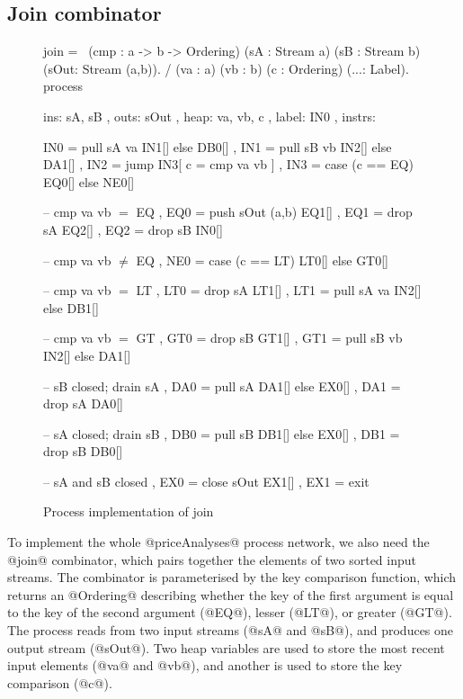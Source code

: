 \subsection{Join combinator}

\begin{figure}
\begin{process}
join 
  = \ (cmp : a -> b -> Ordering)
      (sA  : Stream a) (sB : Stream b)
      (sOut: Stream (a,b)). 
    / (va : a) (vb : b) (c : Ordering) (...: Label).
    process
     { ins:    { sA, sB }
     , outs:   { sOut }
     , heap:   { va, vb, c }
     , label:  IN0
     , instrs: { IN0 = pull  sA va      IN1[] else DB0[]
               , IN1 = pull  sB vb      IN2[] else DA1[]
               , IN2 = jump             IN3[ c = cmp va vb ]
               , IN3 = case  (c == EQ)  EQ0[] else NE0[]

               -- cmp va vb $=$ EQ
               , EQ0 = push  sOut (a,b) EQ1[]
               , EQ1 = drop  sA         EQ2[]
               , EQ2 = drop  sB         IN0[]

               -- cmp va vb $\not=$ EQ
               , NE0 = case  (c == LT)  LT0[] else GT0[]

               -- cmp va vb $=$ LT
               , LT0 = drop  sA         LT1[]
               , LT1 = pull  sA va      IN2[] else DB1[]

               -- cmp va vb $=$ GT
               , GT0 = drop  sB         GT1[]
               , GT1 = pull  sB vb      IN2[] else DA1[]

               -- sB closed; drain sA
               , DA0 = pull  sA         DA1[] else EX0[]
               , DA1 = drop  sA         DA0[]

               -- sA closed; drain sB
               , DB0 = pull  sB         DB1[] else EX0[]
               , DB1 = drop  sB         DB0[]

               -- sA and sB closed
               , EX0 = close sOut       EX1[]
               , EX1 = exit } }
\end{process}
\caption{Process implementation of join}
\label{figs/procs/impl/join}
\end{figure}

To implement the whole @priceAnalyses@ process network, we also need the @join@ combinator, which pairs together the elements of two sorted input streams.
The combinator is parameterised by the key comparison function, which returns an @Ordering@ describing whether the key of the first argument is equal to the key of the second argument (@EQ@), lesser (@LT@), or greater (@GT@).
The process reads from two input streams (@sA@ and @sB@), and produces one output stream (@sOut@).
Two heap variables are used to store the most recent input elements (@va@ and @vb@), and another is used to store the key comparison (@c@).

